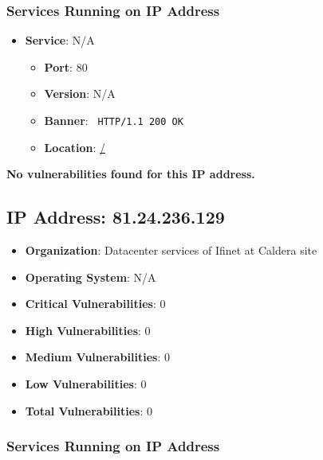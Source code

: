 \documentclass{article}
\begin{document}
\subsubsection*{Services Running on IP Address}

\begin{itemize}
    
        \item \textbf{Service}: N/A
        \begin{itemize}
            \item \textbf{Port}: 80
            \item \textbf{Version}:  N/A 
            \item \textbf{Banner}: \texttt{ HTTP/1.1 200 OK
 }
            \item \textbf{Location}: \href{ / }{ / }
        \end{itemize}
    
\end{itemize}


\textbf{No vulnerabilities found for this IP address.}


\clearpage



\subsection*{IP Address: 81.24.236.129}

\begin{itemize}
    \item \textbf{Organization}: Datacenter services of Ifinet at Caldera site
    \item \textbf{Operating System}:  N/A 
    \item \textbf{Critical Vulnerabilities}: 0
    \item \textbf{High Vulnerabilities}: 0
    \item \textbf{Medium Vulnerabilities}: 0
    \item \textbf{Low Vulnerabilities}: 0
    \item \textbf{Total Vulnerabilities}: 0
\end{itemize}

\subsubsection*{Services Running on IP Address}
\end{document}
